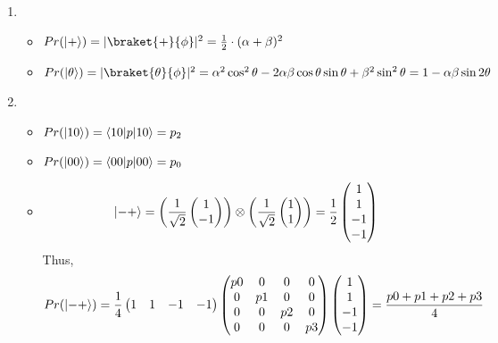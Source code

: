 \documentclass[a4paper,10pt]{hw}
\DeclarePairedDelimiter\bra{\langle}{\rvert}
\DeclarePairedDelimiter\ket{\lvert}{\rangle}
\begin{document}
\begin{enumerate}

\item

\begin{itemize}

	\item
	$ Pr(\ket{+}) = |\braket{+}{\phi}|^2 = \frac{1}{2} \cdot (\alpha + \beta)^2
	 $

	\item
	$ Pr(\ket{\theta}) = |\braket{\theta}{\phi}|^2 = \alpha^2\cos^2\theta - 2\alpha\beta\cos\theta\sin\theta + \beta^2\sin^2\theta = 1 -\alpha\beta\sin{2\theta}
	$

\end{itemize}

\item

\begin{itemize}

	\item
	$Pr(\ket{10}) = \bra{10}p\ket{10} = p_2$
	
	\item
	$Pr(\ket{00}) = \bra{00}p\ket{00} = p_0$

\end{itemize}


\begin{itemize}

	\item
	$$\ket{-+} = 
	\left(\frac{1}{\sqrt{2}} \begin{pmatrix} 1 \\ -1 \end{pmatrix}\right) 
	\otimes \left(\frac{1}{\sqrt{2}} \begin{pmatrix} 1 \\ 1 \end{pmatrix}\right)
	=
	\frac{1}{2} \begin{pmatrix} 1 \\ 1 \\ -1 \\ -1 \end{pmatrix}
	$$
	Thus,
	$$
	Pr({\ket{-+}}) = \frac{1}{4} \begin{pmatrix} 1 & 1 & -1 & -1 \end{pmatrix}
	\begin{pmatrix}
	p0 & 0 & 0 & 0 \\
	0 & p1 & 0 & 0 \\
	0 & 0 & p2 & 0 \\
	0 & 0 & 0 & p3
	\end{pmatrix}
	\begin{pmatrix} 1 \\ 1 \\ -1 \\ -1 \end{pmatrix}
	=
	\frac{p0 + p1 + p2 + p3}{4}
	$$	
	

\end{itemize}
\end{enumerate}
\end{document}
